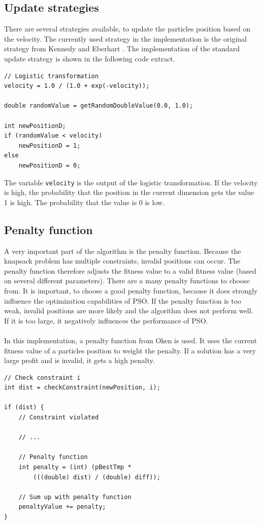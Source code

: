 \documentclass{article}
\begin{document}
\subsection{Update strategies}
There are several strategies available, to update the particles position based on the velocity. The currently used strategy in the implementation is the original strategy from Kennedy and Eberhart \cite{bib-discrete}. The implementation of the standard update strategy is shown in the following code extract.\\

\begin{lstlisting}[caption="UpdateStrategy.cpp"]
// Logistic transformation
velocity = 1.0 / (1.0 + exp(-velocity));

double randomValue = getRandomDoubleValue(0.0, 1.0);

int newPositionD;
if (randomValue < velocity)
    newPositionD = 1;
else
    newPositionD = 0;
\end{lstlisting}

The variable \lstinline{velocity} is the output of the logistic transformation. If the velocity is high, the probability that the position in the current dimension gets the value 1 is high. The probability that the value is 0 is low.

\subsection{Penalty function}
A very important part of the algorithm is the penalty function. Because the knapsack problem has multiple constraints, invalid positions can occur. The penalty function therefore adjusts the fitness value to a valid fitness value (based on several different parameters). There are a many penalty functions to choose from. It is important, to choose a good penalty function, because it does strongly influence the optimization capabilities of PSO. If the penalty function is too weak, invalid positions are more likely and the algorithm does not perform well. If it is too large, it negatively influences the performance of PSO.\\ \\
In this implementation, a penalty function from Oken \cite{bib-penalty} is used. It uses the current fitness value of a particles position to weight the penalty. If a solution has a very large profit and is invalid, it gets a high penalty.\\

\begin{lstlisting}[caption="Solver.cpp"]
// Check constraint i
int dist = checkConstraint(newPosition, i);

if (dist) {
	// Constraint violated
	
	// ...
	
	// Penalty function
	int penalty = (int) (pBestTmp *
		(((double) dist) / (double) diff));
		
	// Sum up with penalty function
	penaltyValue += penalty;
}
\end{lstlisting}
\end{document}

